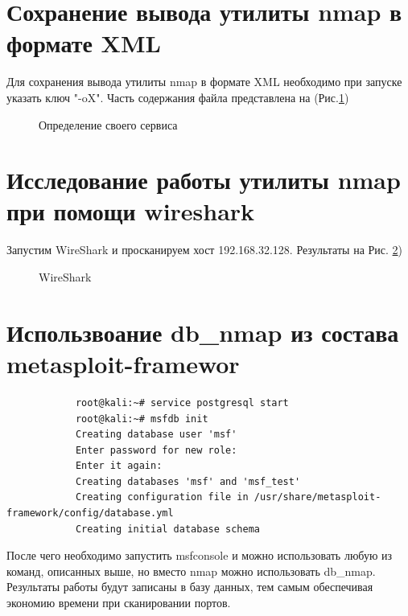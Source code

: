 \documentclass[10pt,a4paper]{report}
\begin{document}
\section{Сохранение вывода утилиты nmap в формате XML}
Для сохранения вывода утилиты nmap в формате  XML необходимо при запуске указать ключ "-oX". Часть содержания файла представлена на (Рис.\ref{pic:pic9})

			\begin{figure}[ht]	
	\caption{Определение своего сервиса}
	\label{pic:pic9}
\end{figure} 	

\section{Исследование работы утилиты nmap при помощи wireshark}
Запустим WireShark и просканируем хост 192.168.32.128. Результаты на Рис. \ref{pic:pic10})

			\begin{figure}[ht]	
	\caption{WireShark}
	\label{pic:pic10}
\end{figure} 
\section{Использвоание db\_nmap из состава metasploit-framewor}
\begin{verbatim}
			root@kali:~# service postgresql start
			root@kali:~# msfdb init
			Creating database user 'msf'
			Enter password for new role: 
			Enter it again: 
			Creating databases 'msf' and 'msf_test'
			Creating configuration file in /usr/share/metasploit-framework/config/database.yml
			Creating initial database schema
		\end{verbatim}
		После чего необходимо запустить msfconsole и можно использовать любую из команд, описанных выше, но вместо nmap можно использовать db\_nmap. Результаты работы будут записаны в базу данных, тем самым обеспечивая экономию времени при сканировании портов.
\end{document}
